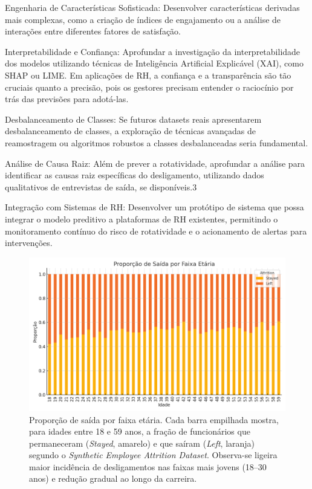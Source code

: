 \documentclass[sigconf]{acmart}
\begin{document}
Engenharia de Características Sofisticada: Desenvolver características derivadas mais complexas, como a criação de índices de engajamento ou a análise de interações entre diferentes fatores de satisfação.

Interpretabilidade e Confiança: Aprofundar a investigação da interpretabilidade dos modelos utilizando técnicas de Inteligência Artificial Explicável (XAI), como SHAP ou LIME. Em aplicações de RH, a confiança e a transparência são tão cruciais quanto a precisão, pois os gestores precisam entender o raciocínio por trás das previsões para adotá-las.

Desbalanceamento de Classes: Se futuros datasets reais apresentarem desbalanceamento de classes, a exploração de técnicas avançadas de reamostragem ou algoritmos robustos a classes desbalanceadas seria fundamental.

Análise de Causa Raiz: Além de prever a rotatividade, aprofundar a análise para identificar as causas raiz específicas do desligamento, utilizando dados qualitativos de entrevistas de saída, se disponíveis.3

Integração com Sistemas de RH: Desenvolver um protótipo de sistema que possa integrar o modelo preditivo a plataformas de RH existentes, permitindo o monitoramento contínuo do risco de rotatividade e o acionamento de alertas para intervenções.

\begin{figure}[!htbp]
    \centering
    \includegraphics[width=\linewidth]{images/age_attrition_distribution.png}
    \caption{Proporção de saída por faixa etária. Cada barra empilhada mostra, para idades entre 18 e 59 anos, a fração de funcionários que permaneceram (\textit{Stayed}, amarelo) e que saíram (\textit{Left}, laranja) segundo o \textit{Synthetic Employee Attrition Dataset}. Observa-se ligeira maior incidência de desligamentos nas faixas mais jovens (18–30 anos) e redução gradual ao longo da carreira.}
\end{figure}
\end{document}
